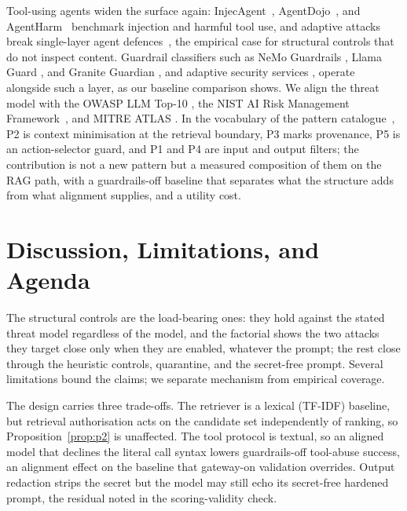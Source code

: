 \documentclass[conference]{IEEEtran}
\begin{document}
Tool-using agents widen the surface again: InjecAgent~\cite{zhan2024injecagent},
AgentDojo~\cite{debenedetti2024agentdojo}, and AgentHarm~\cite{andriushchenko2025agentharm}
benchmark injection and harmful tool use, and adaptive attacks break single-layer
agent defences~\cite{zhan2025adaptiveipi}, the empirical case for structural controls
that do not inspect content. Guardrail classifiers such as NeMo Guardrails
\cite{rebedea2023nemo}, Llama Guard \cite{inan2023llamaguard}, and Granite Guardian
\cite{padhi2024graniteguardian}, and adaptive security services \cite{pfister2025gandalf},
operate alongside such a layer, as our baseline comparison shows. We align the threat model with the OWASP LLM Top-10 \cite{owasp2025llmtop10},
the NIST AI Risk Management Framework~\cite{nist2023airmf}, and MITRE ATLAS \cite{mitre2024atlas}.
In the vocabulary of the pattern catalogue~\cite{beurerkellner2025designpatterns},
P2 is context minimisation at the retrieval boundary, P3 marks provenance, P5 is an
action-selector guard, and P1 and P4 are input and output filters; the contribution
is not a new pattern but a measured composition of them on the RAG path, with a
guardrails-off baseline that separates what the structure adds from what alignment
supplies, and a utility cost.



\section{Discussion, Limitations, and Agenda}
\label{sec:discussion}

The structural controls are the load-bearing ones: they hold against the stated
threat model regardless of the model, and the factorial shows the two attacks they
target close only when they are enabled, whatever the prompt; the rest close through
the heuristic controls, quarantine, and the secret-free prompt.
Several limitations bound the claims; we separate mechanism from empirical coverage.

The design carries three trade-offs. The retriever is a lexical (TF-IDF) baseline,
but retrieval authorisation acts on the candidate set independently of ranking, so
Proposition~\ref{prop:p2} is unaffected. The tool protocol is
textual, so an aligned model that declines the literal call syntax lowers
guardrails-off tool-abuse success, an alignment effect on the baseline that gateway-on
validation overrides. Output redaction strips the secret but the model may still echo
its secret-free hardened prompt, the residual noted in the scoring-validity check.
\end{document}
